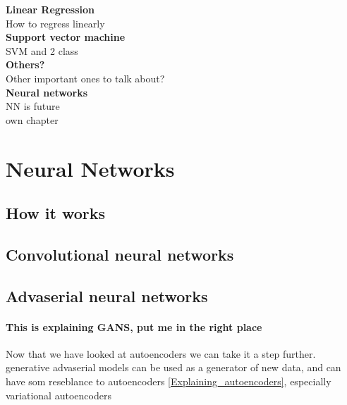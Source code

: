 	  \vspace{5px}
	  \textbf{Linear Regression}\\
	  How to regress linearly\\
	  
	  \vspace{5px}
	  \textbf{Support vector machine}\\
	  SVM and 2 class\\
	  
	  \vspace{5px}
	  \textbf{Others?}\\
	  Other important ones to talk about?\\
	
	
	  \vspace{5px}
	  \textbf{Neural networks}\\
	  NN is future\\
	  own chapter\\
	  

	
\section{Neural Networks}
	  
    \subsection{How it works}
	
	  
    \subsection{Convolutional neural networks}
	  
    \subsection{Advaserial neural networks}
  	  	\paragraph{This is explaining GANS, put me in the right place} %
	  Now that we have looked at autoencoders we can take it a step further. 
	  generative advaserial models can be used as a generator of new data, and can have som reseblance to autoencoders \ref{Explaining_autoencoders}, especially variational autoencoders %
	  
